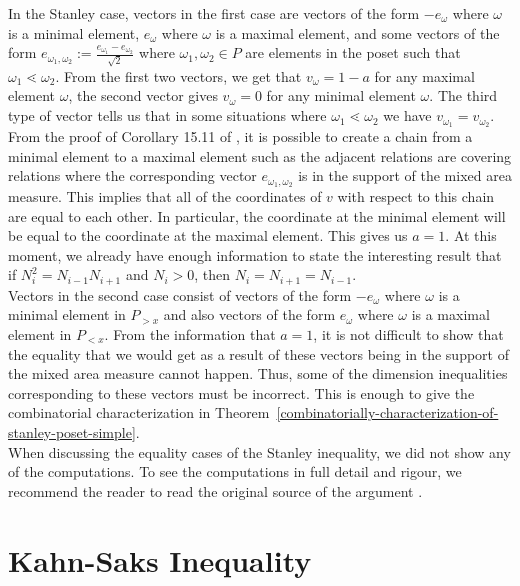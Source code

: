 \documentclass{puthesis-UG}
\begin{document}
In the Stanley case, vectors in the first case are vectors of the form $-e_{\omega}$ where $\omega$ is a minimal element, $e_\omega$ where $\omega$ is a maximal element, and some vectors of the form $e_{\omega_1,\omega_2} := \frac{e_{\omega_1} - e_{\omega_2}}{\sqrt{2}}$ where $\omega_1, \omega_2 \in P$ are elements in the poset such that $\omega_1 \lessdot \omega_2$. From the first two vectors, we get that $v_\omega = 1-a$ for any maximal element $\omega$, the second vector gives $v_\omega = 0$ for any minimal element $\omega$. The third type of vector tells us that in some situations where $\omega_1 \lessdot \omega_2$ we have $v_{\omega_1} = v_{\omega_2}$. From the proof of Corollary 15.11 of \cite{shenfeld2022extremals}, it is possible to create a chain from a minimal element to a maximal element such as the adjacent relations are covering relations where the corresponding vector $e_{\omega_1, \omega_2}$ is in the support of the mixed area measure. This implies that all of the coordinates of $v$ with respect to this chain are equal to each other. In particular, the coordinate at the minimal element will be equal to the coordinate at the maximal element. This gives us $a = 1$. At this moment, we already have enough information to state the interesting result that if $N_i^2 = N_{i-1} N_{i+1}$ and $N_i > 0$, then $N_i = N_{i+1} = N_{i-1}$. \\

Vectors in the second case consist of vectors of the form $-e_\omega$ where $\omega$ is a minimal element in $P_{> x}$ and also vectors of the form $e_\omega$ where $\omega$ is a maximal element in $P_{< x}$. From the information that $a = 1$, it is not difficult to show that the equality that we would get as a result of these vectors being in the support of the mixed area measure cannot happen. Thus, some of the dimension inequalities corresponding to these vectors must be incorrect. This is enough to give the combinatorial characterization in Theorem~\ref{combinatorially-characterization-of-stanley-poset-simple}. \\

When discussing the equality cases of the Stanley inequality, we did not show any of the computations. To see the computations in full detail and rigour, we recommend the reader to read 
the original source of the argument \cite{shenfeld2022extremals}. 

\section{Kahn-Saks Inequality} \label{kahn-saks-inequality}
\end{document}

